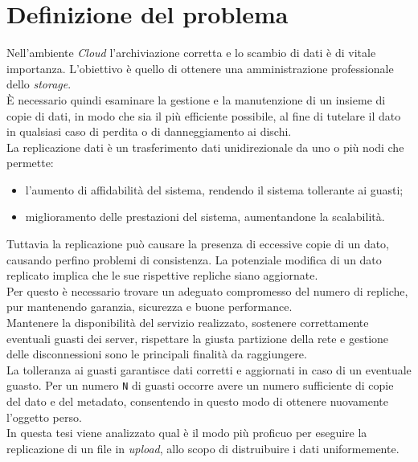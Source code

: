 \chapter{Definizione del problema}
\setcounter{section}{1}
Nell'ambiente \textit{Cloud} l'archiviazione corretta e lo scambio di dati \`{e} di vitale importanza. L'obiettivo \`{e} quello di ottenere una amministrazione professionale dello \textit{storage}.\\
\`{E} necessario quindi esaminare la gestione e la manutenzione di un insieme di copie di dati, in modo che sia il pi\`{u} efficiente possibile, al fine di tutelare il dato in qualsiasi caso di perdita o di danneggiamento ai dischi.\\

La replicazione dati \`{e} un trasferimento dati unidirezionale da uno o pi\`{u} nodi che permette:
\begin{itemize}
\item 
l'aumento di affidabilit\`{a} del sistema, rendendo il sistema tollerante ai guasti;
\item
miglioramento delle prestazioni del sistema, aumentandone la scalabilit\`{a}.
\end{itemize}

Tuttavia la replicazione pu\`{o} causare la presenza di eccessive copie di un dato, causando perfino problemi di consistenza. La potenziale modifica di un dato replicato implica che le sue rispettive repliche siano aggiornate. \\
Per questo \`{e} necessario trovare un adeguato compromesso del numero di repliche, pur mantenendo garanzia, sicurezza e buone performance.\\

Mantenere la disponibilit\`{a} del servizio realizzato, sostenere correttamente eventuali guasti dei server, rispettare la giusta partizione della rete e gestione delle disconnessioni sono le principali finalit\`{a} da raggiungere.\\
La tolleranza ai guasti garantisce dati corretti e aggiornati in caso di un eventuale guasto. Per un numero \verb"N" di guasti occorre avere un numero sufficiente di copie del dato e del metadato, consentendo in questo modo di ottenere nuovamente l'oggetto perso.\\

In questa tesi viene analizzato qual \`{e} il modo pi\`{u} proficuo per eseguire la replicazione di un file in \textit{upload}, allo scopo di distruibuire i dati uniformemente.\\

